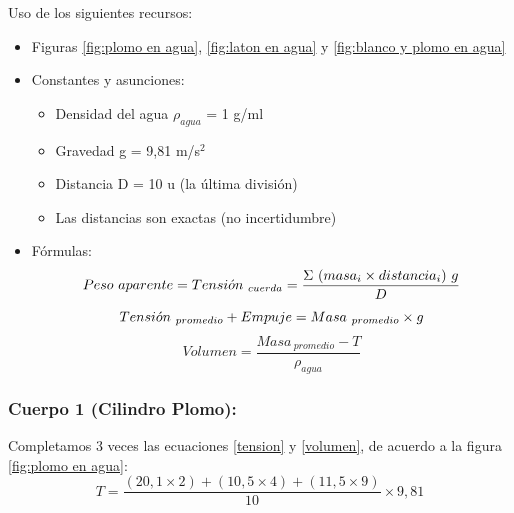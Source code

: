 \documentclass[10pt]{article}
\begin{document}
Uso de los siguientes recursos:    
\begin{itemize}
    
    \item Figuras \ref{fig:plomo en agua}, \ref{fig:laton en agua} y           \ref{fig:blanco y plomo en agua}
    
    \item Constantes y asunciones:
        \begin{itemize}
            \item Densidad del agua $\rho_{agua}$ = 1 g/ml
            \item Gravedad g = 9,81 m/s$^{2}$
            \item Distancia D = 10 u (la última división)
            \item Las distancias son exactas (no incertidumbre)
        \end{itemize}
    
    \item Fórmulas:
    \large
    {\begin{equation}
        \label{tension}
        Peso~aparente = Tensi\Acute{o}n_{~cuerda}= \frac{\Sigma~(masa_{i} \times distancia_{i})~g}{D}
    \end{equation}
    \vspace{-0.1cm}
    \begin{equation*}
        Tensi\Acute{o}n_{~promedio} + Empuje = Masa_{~promedio} \times g 
    \end{equation*}
    \vspace{-0.2cm}
    \begin{equation}
        \label{volumen}
        Volumen = \frac{Masa_{~promedio} - T}{\rho_{agua}} 
    \end{equation}}
\end{itemize}

\subsubsection{Cuerpo 1 (Cilindro Plomo):}
\vspace{0,2cm}

Completamos 3 veces las ecuaciones \ref{tension} y \ref{volumen}, de acuerdo a la figura \ref{fig:plomo en agua}:\\

\begin{equation}
    T = \frac{(20,1\times2)+(10,5\times4)+(11,5\times9)}{10}\times9,81
\end{equation}
\end{document}
